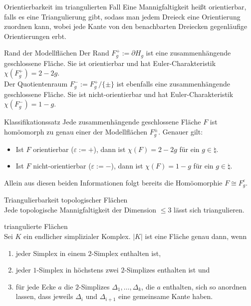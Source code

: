 \begin{Def}{Orientierbarkeit im triangulierten Fall}
    Eine Mannigfaltigkeit heißt orientierbar, falls es eine Triangulierung
    gibt, sodass man jedem Dreieck eine Orientierung zuordnen kann, wobei
    jede Kante von den benachbarten Dreiecken gegenläufige Orientierungen erbt.
\end{Def}

\begin{Satz}{Rand der Modellflächen}
    Der Rand $F_g^+ := \partial H_g$ ist eine zusammenhängende
    geschlossene Fläche.
    Sie ist orientierbar und hat Euler-Charakteristik
    $\chi(F_g^+) = 2 - 2g$. \\
    Der Quotientenraum $F_g^- := F_g^+ / \{\pm\}$ ist ebenfalls eine
    zusammenhängende geschlossene Fläche.
    Sie ist nicht-orientierbar und hat Euler-Charakteristik
    $\chi(F_g^-) = 1 - g$.
\end{Satz}

\linie

\begin{Satz}{Klassifikationssatz}
    Jede zusammenhängende geschlossene Fläche $F$ ist homöomorph zu genau einer
    der Modellflächen $F_g^\pm$.
    Genauer gilt:
    \begin{itemize}
        \item
        Ist $F$ orientierbar ($\varepsilon := +$),
        dann ist $\chi(F) = 2 - 2g$ für ein $g \in \natural$.
        
        \item
        Ist $F$ nicht-orientierbar ($\varepsilon := -$),
        dann ist $\chi(F) = 1 - g$ für ein $g \in \natural$.
    \end{itemize}
    Allein aus diesen beiden Informationen folgt bereits die Homöomorphie
    $F \cong F_g^\varepsilon$.
\end{Satz}

\linie

\begin{Satz}{Triangulierbarkeit topologischer Flächen}\\
    Jede topologische Mannigfaltigkeit der Dimension $\le 3$ lässt sich
    triangulieren.
\end{Satz}

\begin{Satz}{triangulierte Flächen}\\
    Sei $K$ ein endlicher simplizialer Komplex.
    $|K|$ ist eine Fläche genau dann, wenn
    \begin{enumerate}
        \item
        jeder Simplex in einem $2$-Simplex enthalten ist,
        
        \item
        jeder $1$-Simplex in höchstens zwei $2$-Simplizes enthalten ist und
        
        \item
        für jede Ecke $a$ die $2$-Simplizes $\Delta_1, \dotsc, \Delta_k$,
        die $a$ enthalten, sich so anordnen lassen, dass jeweils
        $\Delta_i$ und $\Delta_{i+1}$ eine gemeinsame Kante haben.
    \end{enumerate}
\end{Satz}

